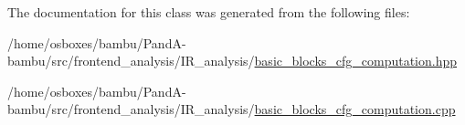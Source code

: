 The documentation for this class was generated from the following files\+:\begin{DoxyCompactItemize}
\item 
/home/osboxes/bambu/\+Pand\+A-\/bambu/src/frontend\+\_\+analysis/\+I\+R\+\_\+analysis/\hyperlink{basic__blocks__cfg__computation_8hpp}{basic\+\_\+blocks\+\_\+cfg\+\_\+computation.\+hpp}\item 
/home/osboxes/bambu/\+Pand\+A-\/bambu/src/frontend\+\_\+analysis/\+I\+R\+\_\+analysis/\hyperlink{basic__blocks__cfg__computation_8cpp}{basic\+\_\+blocks\+\_\+cfg\+\_\+computation.\+cpp}\end{DoxyCompactItemize}
